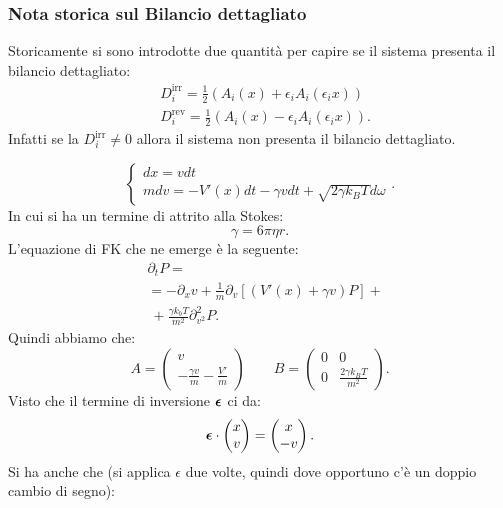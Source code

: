 \subsubsection{Nota storica sul Bilancio dettagliato}%
\label{subsub:Nota storica sul Bilancio dettagliato}
Storicamente si sono introdotte due quantità per capire se il sistema presenta il bilancio dettagliato:
\[\begin{aligned}
    & D^{\text{irr}}_i = \frac{1}{2}\left(A_i(x) + \epsilon_i A_i(\epsilon_ix)\right)\\
    & D^{\text{rev}}_i = \frac{1}{2}\left(A_i(x) - \epsilon_iA_i(\epsilon_ix) \right)
.\end{aligned}\]
Infatti se la $D^{\text{irr}}_i\neq 0$ allora il sistema non presenta il bilancio dettagliato.

\begin{exmp}[]
    \[
        \begin{cases}
            dx = vdt\\
	    mdv = -V'(x) dt - \gamma v dt + \sqrt{2\gamma  k_B T} d\omega
        \end{cases}
    .\] 
    In cui si ha un termine di attrito alla Stokes:
    \[
        \gamma = 6\pi  \eta r
    .\] 
   L'equazione di FK che ne emerge è la seguente:
   \[\begin{aligned}
       &\partial_{t}P =\\
       &=-\partial_{x}v + \frac{1}{m}\partial_{v}\left[\left(V'(x) + \gamma v\right)P\right] +\\
       &  \ +\frac{\gamma k_b T}{m^2}\partial^2_{v^2}P
   .\end{aligned}\]
   Quindi abbiamo che:
   \[
       A = \begin{pmatrix} v \\ - \frac{\gamma  v}{m} - \frac{V'}{m}\end{pmatrix} 
       \qquad 
       B = \begin{pmatrix} 
	   0 & 0 \\
	   0 & \frac{2\gamma k_BT}{m^2}
           \end{pmatrix} 
   .\] 
   Visto che il termine di inversione $\boldsymbol{\epsilon}$ ci da:
   \[
       \boldsymbol{\epsilon}\cdot \begin{pmatrix} x \\ v \end{pmatrix} = \begin{pmatrix} x \\ -v \end{pmatrix} 
   .\] 
   Si ha anche che (si applica $\epsilon$ due volte, quindi dove opportuno c'è un doppio cambio di segno):

\end{exmp}

